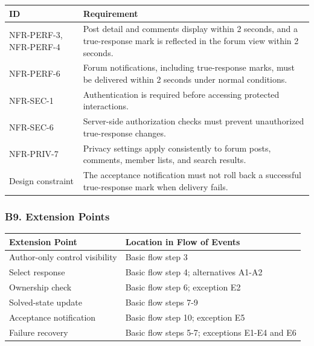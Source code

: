 \documentclass[12pt]{article}
\renewcommand{\baselinestretch}{1.5}
\begin{document}
\begingroup
\small
\renewcommand{\baselinestretch}{1.0}\selectfont
\renewcommand{\arraystretch}{1.15}
\setlength{\tabcolsep}{6pt}
\begin{longtable}{|>{\raggedright\arraybackslash}p{}|>{\raggedright\arraybackslash}p{}|}
\hline
\textbf{ID} & \textbf{Requirement} \\ \hline
\endhead
NFR-PERF-3, NFR-PERF-4 & Post detail and comments display within 2 seconds, and a true-response mark is reflected in the forum view within 2 seconds. \\ \hline
NFR-PERF-6 & Forum notifications, including true-response marks, must be delivered within 2 seconds under normal conditions. \\ \hline
NFR-SEC-1 & Authentication is required before accessing protected interactions. \\ \hline
NFR-SEC-6 & Server-side authorization checks must prevent unauthorized true-response changes. \\ \hline
NFR-PRIV-7 & Privacy settings apply consistently to forum posts, comments, member lists, and search results. \\ \hline
Design constraint & The acceptance notification must not roll back a successful true-response mark when delivery fails. \\ \hline
\end{longtable}
\endgroup
\par\medskip

\hypertarget{sec:b9-extension-points}{}
\subsubsection*{B9. Extension Points}
\par\medskip

\begingroup
\small
\renewcommand{\baselinestretch}{1.0}\selectfont
\renewcommand{\arraystretch}{1.15}
\setlength{\tabcolsep}{6pt}
\begin{longtable}{|>{\raggedright\arraybackslash}p{}|>{\raggedright\arraybackslash}p{}|}
\hline
\textbf{Extension Point} & \textbf{Location in Flow of Events} \\ \hline
\endhead
Author-only control visibility & Basic flow step 3 \\ \hline
Select response & Basic flow step 4; alternatives A1-A2 \\ \hline
Ownership check & Basic flow step 6; exception E2 \\ \hline
Solved-state update & Basic flow steps 7-9 \\ \hline
Acceptance notification & Basic flow step 10; exception E5 \\ \hline
Failure recovery & Basic flow steps 5-7; exceptions E1-E4 and E6 \\ \hline
\end{longtable}
\endgroup
\par\medskip
\end{document}
